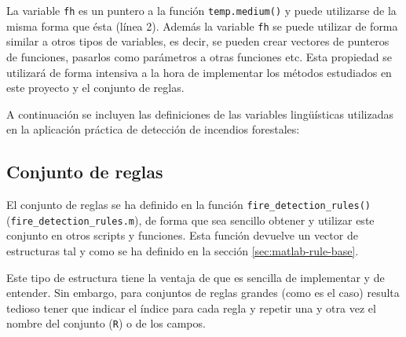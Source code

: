 La variable \lstinline|fh| es un puntero a la función \lstinline|temp.medium()| y puede utilizarse de la misma forma que ésta (línea 2). Además la variable \lstinline|fh| se puede utilizar de forma similar a otros tipos de variables, es decir, se pueden crear vectores de punteros de funciones, pasarlos como parámetros a otras funciones etc. Esta propiedad se utilizará de forma intensiva a la hora de implementar los métodos estudiados en este proyecto y el conjunto de reglas.

A continuación se incluyen las definiciones de las variables lingüísticas utilizadas en la aplicación práctica de detección de incendios forestales:













\subsection{Conjunto de reglas}

El conjunto de reglas se ha definido en la función \lstinline|fire_detection_rules()| (\lstinline|fire_detection_rules.m|), de forma que sea sencillo obtener y utilizar este conjunto en otros scripts y funciones. Esta función devuelve un vector de estructuras tal y como se ha definido en la sección \ref{sec:matlab-rule-base}.

Este tipo de estructura tiene la ventaja de que es sencilla de implementar y de entender. Sin embargo, para conjuntos de reglas grandes (como es el caso) resulta tedioso tener que indicar el índice para cada regla y repetir una y otra vez el nombre del conjunto (\lstinline|R|) o de los campos. 

